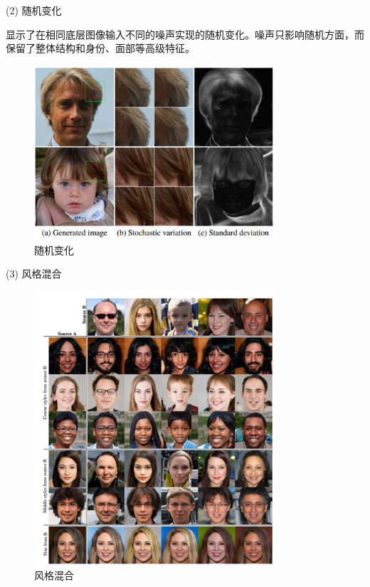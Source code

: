 (2) 随机变化

显示了在相同底层图像输入不同的噪声实现的随机变化。噪声只影响随机方面，而保留了整体结构和身份、面部等高级特征。

\begin{figure}[htb]
\centering 
\includegraphics[width=0.8\textwidth]{img/m2t11.png} 
\caption{随机变化}
\label{Test}
\end{figure}

(3) 风格混合

\begin{figure}[htb]
\centering 
\includegraphics[width=0.8\textwidth]{img/m2t12.png} 
\caption{风格混合}
\label{Test}
\end{figure}

